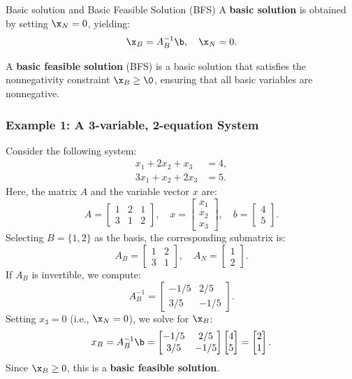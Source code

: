 \begin{definition}{Basic solution and Basic Feasible Solution (BFS)}{}{}
A \textbf{basic solution} is obtained by setting \( \x_N = 0 \), yielding:
\begin{equation}
\x_B = A_B^{-1} \b, \quad \x_N = 0.
\end{equation}

A \textbf{basic feasible solution} (BFS) is a basic solution that satisfies the nonnegativity constraint \( \x_B \geq \0 \), ensuring that all basic variables are nonnegative.
\end{definition}
\subsubsection*{Example 1: A 3-variable, 2-equation System}

Consider the following system:
\[
\begin{aligned}
    x_1 + 2x_2 + x_3 &= 4, \\
    3x_1 + x_2 + 2x_3 &= 5.
\end{aligned}
\]
Here, the matrix \( A \) and the variable vector \( x \) are:
\[
A =
\begin{bmatrix}
    1 & 2 & 1 \\
    3 & 1 & 2
\end{bmatrix}, \quad
x =
\begin{bmatrix}
    x_1 \\ x_2 \\ x_3
\end{bmatrix}, \quad
b =
\begin{bmatrix}
    4 \\ 5
\end{bmatrix}.
\]
Selecting \(B= \{1, 2\} \) as the basis, the corresponding submatrix is:
\[
A_B =
\begin{bmatrix}
    1 & 2 \\
    3 & 1
\end{bmatrix}, \quad A_N =
\begin{bmatrix}
    1 \\
    2
\end{bmatrix}.
\]
If \( A_B \) is invertible, we compute:
\[
A_B^{-1} =
\begin{bmatrix}
    -1/5 & 2/5 \\
    3/5 & -1/5
\end{bmatrix}.
\]
Setting \( x_3 = 0 \) (i.e., \( \x_N = 0 \)), we solve for \( \x_B \):
\[
x_B = A_B^{-1}\b=
\begin{bmatrix}
    -1/5 & 2/5 \\
    3/5 & -1/5
\end{bmatrix}
\begin{bmatrix}
    4 \\ 5
\end{bmatrix}
=
\begin{bmatrix}
    2 \\
    1
\end{bmatrix}.
\]
Since \( \x_B \geq 0 \), this is a \textbf{basic feasible solution}.

